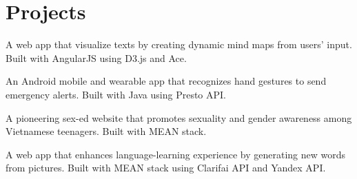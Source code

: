 \documentclass[]{hieudo-build}
\begin{document}
\begin{minipage}[t]{0.65\textwidth}


\section{Projects}
\descript{}
A web app that visualize texts by creating dynamic mind maps from users' input. Built with AngularJS using D3.js and Ace.
\sectionsep

\descript{}
An Android mobile and wearable app that recognizes hand gestures to send emergency alerts. Built with Java using Presto API.
\sectionsep 

\descript{}
A pioneering sex-ed website that promotes sexuality and gender awareness among Vietnamese teenagers. Built with MEAN stack.
\sectionsep

\descript{}
A web app that enhances language-learning experience by generating new words from pictures. Built with MEAN stack using Clarifai API and Yandex API.
\sectionsep 

\end{minipage} 
\end{document}
